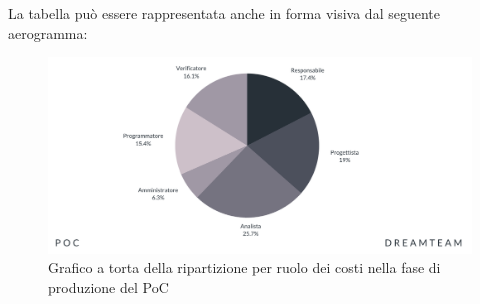 La tabella può essere rappresentata anche in forma visiva dal seguente aerogramma:

\begin{figure}[!h]
\centering
\includegraphics[scale=0.65]{Sezioni/SezioniPreventivo/grafici/Poc_costi.png}
\caption{Grafico a torta della ripartizione per ruolo dei costi nella fase di produzione del PoC}
\end{figure}